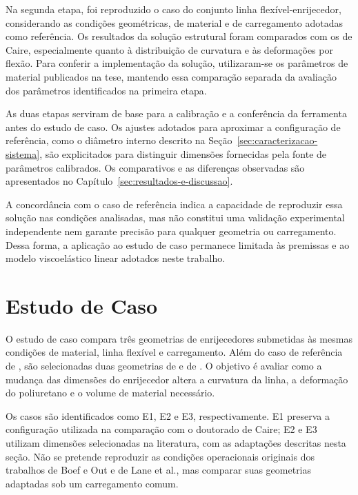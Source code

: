 \documentclass[arial,centeredequations,english,brazilian,oneside,section=TITLE]{ifes8}
\begin{document}
Na segunda etapa, foi reproduzido o caso do conjunto linha flexível-enrijecedor,
considerando as condições geométricas, de material e de carregamento adotadas
como referência. Os resultados da solução estrutural foram comparados com os
de Caire, especialmente quanto à distribuição de curvatura e às deformações
por flexão. Para conferir a implementação da solução, utilizaram-se os
parâmetros de material publicados na tese, mantendo essa comparação separada
da avaliação dos parâmetros identificados na primeira etapa.

As duas etapas serviram de base para a calibração e a conferência da ferramenta
antes do estudo de caso. Os ajustes adotados para aproximar a configuração de
referência, como o diâmetro interno descrito na
Seção~\ref{sec:caracterizacao-sistema}, são explicitados para distinguir
dimensões fornecidas pela fonte de parâmetros calibrados. Os comparativos
e as diferenças observadas são apresentados no
Capítulo~\ref{sec:resultados-e-discussao}.

A concordância com o caso de referência indica a capacidade de reproduzir
essa solução nas condições analisadas, mas não constitui uma validação
experimental independente nem garante precisão para qualquer geometria ou
carregamento. Dessa forma, a aplicação ao estudo de caso permanece limitada
às premissas e ao modelo viscoelástico linear adotados neste trabalho.


\section{Estudo de Caso}
\label{sec:estudo-de-caso}

O estudo de caso compara três geometrias de enrijecedores submetidas às mesmas
condições de material, linha flexível e carregamento. Além do caso de referência
de , são selecionadas duas geometrias de
 e de .
O objetivo é avaliar como a mudança das dimensões
do enrijecedor altera a curvatura da linha, a deformação do poliuretano e o volume
de material necessário.

Os casos são identificados como E1, E2 e E3, respectivamente. E1 preserva a
configuração utilizada na comparação com o doutorado de Caire; E2 e E3 utilizam
dimensões selecionadas na literatura, com as adaptações descritas nesta seção.
Não se pretende reproduzir as condições operacionais originais dos trabalhos
de Boef e Out e de Lane et al., mas comparar suas geometrias adaptadas sob
um carregamento comum.
\end{document}
